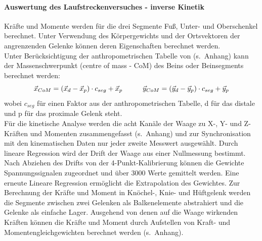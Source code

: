\paragraph{Auswertung des Laufstreckenversuches - inverse Kinetik}
Kräfte und Momente werden für die drei Segmente Fuß, Unter- und Oberschenkel berechnet. Unter Verwendung des Körpergewichts und der Ortsvektoren der angrenzenden Gelenke können deren Eigenschaften berechnet werden.\\
Unter Berücksichtigung der anthropometrischen Tabelle von \textcite{winter2009biomechanics} (s.~Anhang) kann der Massenschwerpunkt (centre of mass - CoM) des Beins oder Beinsegments berechnet werden:
\vspace{-5pt}
\begin{equation}
\vec{x}_{CoM} = (\vec{x}_d - \vec{x}_p) \cdot c_{seg} + \vec{x}_p \hspace{1cm} \vec{y}_{CoM} = (\vec{y}_d - \vec{y}_p) \cdot c_{seg} + \vec{y}_p
\label{eq:CoM_x}
\vspace{-5pt}
\end{equation}
wobei $c_{seg}$ für einen Faktor aus der anthropometrischen Tabelle, d für das distale und p für das proximale Gelenk steht.\\
Für die kinetische Analyse werden die acht Kanäle der Waage zu X-, Y- und Z-Kräften und Momenten zusammengefasst (s.~Anhang) und zur Synchronisation mit den kinematischen Daten nur jeder zweite Messwert ausgewählt. Durch lineare Regression wird der Drift der Waage aus einer Nullmessung bestimmt. Nach Abziehen des Drifts von der 4-Punkt-Kalibrierung können die Gewichte Spannungssignalen zugeordnet und über 3000 Werte gemittelt werden. Eine erneute Lineare Regression ermöglicht die Extrapolation des Gewichtes.
Zur Berechnung der Kräfte und Moment in Knöchel-, Knie- und Hüftgelenk werden die Segmente zwischen zwei Gelenken als Balkenelemente abstrahiert und die Gelenke als einfache Lager. Ausgehend von denen auf die Waage wirkenden Kräften können die Kräfte und Moment durch Aufstellen von Kraft- und Momentengleichgewichten berechnet werden (s.~Anhang).